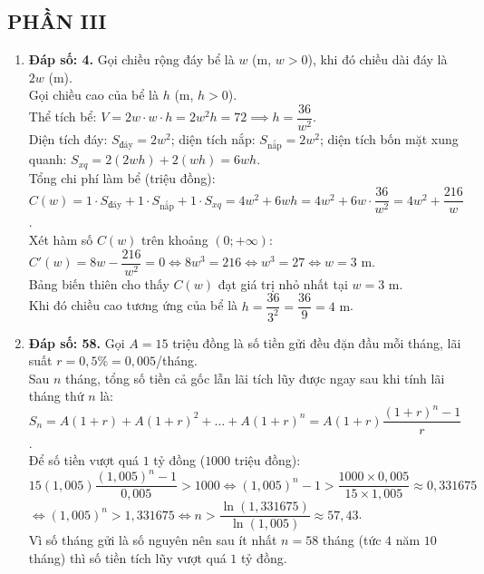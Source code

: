 \documentclass[12pt,a4paper]{article}
\begin{document}
\subsection*{PHẦN III}
\begin{enumerate}[label=\textbf{Câu \arabic*:}, leftmargin=*]
\item \textbf{Đáp số: 4.} Gọi chiều rộng đáy bể là $w$ (m, $w > 0$), khi đó chiều dài đáy là $2w$ (m).\\
Gọi chiều cao của bể là $h$ (m, $h > 0$).\\
Thể tích bể: $V = 2w \cdot w \cdot h = 2w^2 h = 72 \implies h = \dfrac{36}{w^2}$.\\
Diện tích đáy: $S_{\text{đáy}} = 2w^2$; diện tích nắp: $S_{\text{nắp}} = 2w^2$; diện tích bốn mặt xung quanh: $S_{xq} = 2(2wh) + 2(wh) = 6wh$.\\
Tổng chi phí làm bể (triệu đồng):\\
$C(w) = 1 \cdot S_{\text{đáy}} + 1 \cdot S_{\text{nắp}} + 1 \cdot S_{xq} = 4w^2 + 6wh = 4w^2 + 6w \cdot \dfrac{36}{w^2} = 4w^2 + \dfrac{216}{w}$.\\
Xét hàm số $C(w)$ trên khoảng $(0; +\infty)$:\\
$C'(w) = 8w - \dfrac{216}{w^2} = 0 \iff 8w^3 = 216 \iff w^3 = 27 \iff w = 3\text{ m}$.\\
Bảng biến thiên cho thấy $C(w)$ đạt giá trị nhỏ nhất tại $w = 3\text{ m}$.\\
Khi đó chiều cao tương ứng của bể là $h = \dfrac{36}{3^2} = \dfrac{36}{9} = 4\text{ m}$.

\item \textbf{Đáp số: 58.} Gọi $A = 15$ triệu đồng là số tiền gửi đều đặn đầu mỗi tháng, lãi suất $r = 0{,}5\% = 0{,}005$/tháng.\\
Sau $n$ tháng, tổng số tiền cả gốc lẫn lãi tích lũy được ngay sau khi tính lãi tháng thứ $n$ là:\\
$S_n = A(1 + r) + A(1 + r)^2 + \dots + A(1 + r)^n = A(1 + r) \dfrac{(1 + r)^n - 1}{r}$.\\
Để số tiền vượt quá $1$ tỷ đồng ($1000$ triệu đồng):\\
$15(1{,}005) \dfrac{(1{,}005)^n - 1}{0{,}005} > 1000 \iff (1{,}005)^n - 1 > \dfrac{1000 \times 0{,}005}{15 \times 1{,}005} \approx 0{,}331675$\\
$\iff (1{,}005)^n > 1{,}331675 \iff n > \dfrac{\ln(1{,}331675)}{\ln(1{,}005)} \approx 57{,}43$.\\
Vì số tháng gửi là số nguyên nên sau ít nhất $n = 58$ tháng (tức $4$ năm $10$ tháng) thì số tiền tích lũy vượt quá $1$ tỷ đồng.


\end{enumerate}
\end{document}
